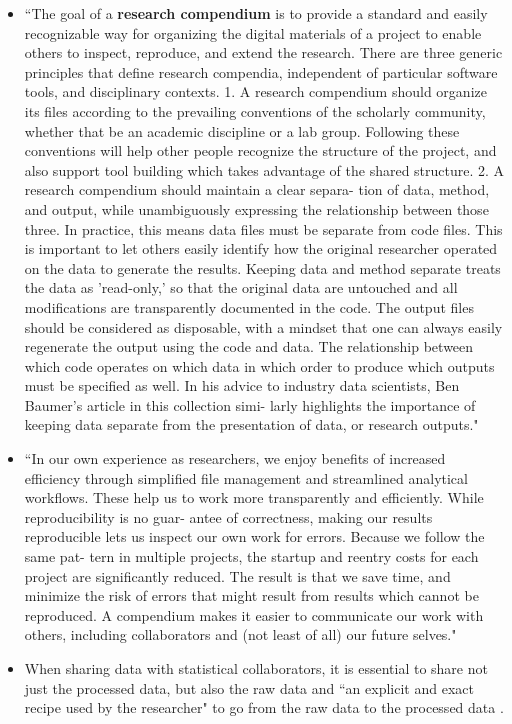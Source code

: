 \documentclass[pdftex,english,11pt,parskip=half]{scrartcl}
\begin{document}
\begin{itemize}
\item ``The goal of a \textbf{research compendium} is to provide a standard and easily recognizable way for organizing the digital materials of a project to enable others to inspect, reproduce, and extend the research. There are three generic principles that define research compendia, independent of particular software tools, and disciplinary contexts. 1. A research compendium should organize its files according to the prevailing conventions of the scholarly community, whether that be an academic discipline or a lab group. Following these conventions will help other people recognize the structure of the project, and also support tool building which takes advantage of the shared structure.
2. A research compendium should maintain a clear separa- tion of data, method, and output, while unambiguously expressing the relationship between those three. In practice, this means data files must be separate from code files. This is important to let others easily identify how the original researcher operated on the data to generate the results. Keeping data and method separate treats the data as 'read-only,' so that the original data are untouched and all modifications are transparently documented in the code. The output files should be considered as disposable, with a mindset that one can always easily regenerate the output using the code and data. The relationship between which code operates on which data in which order to produce which outputs must be specified as well. In his advice to industry data scientists, Ben Baumer's article in this collection simi- larly highlights the importance of keeping data separate from the presentation of data, or research outputs." \cite{marwick2018packaging} 
\item ``In our own experience as researchers, we enjoy benefits of increased efficiency through simplified file management and streamlined analytical workflows. These help us to work more transparently and efficiently. While reproducibility is no guar- antee of correctness, making our results reproducible lets us inspect our own work for errors. Because we follow the same pat- tern in multiple projects, the startup and reentry costs for each project are significantly reduced. The result is that we save time, and minimize the risk of errors that might result from results which cannot be reproduced. A compendium makes it easier to communicate our work with others, including collaborators and (not least of all) our future selves." \cite{marwick2018packaging}
\item When sharing data with statistical collaborators, it is essential to share not just the processed data, but also the raw data and ``an explicit and exact recipe used by the researcher" to go from the raw data to the processed data \cite{ellis2018share}. 

\end{itemize}
\end{document}
